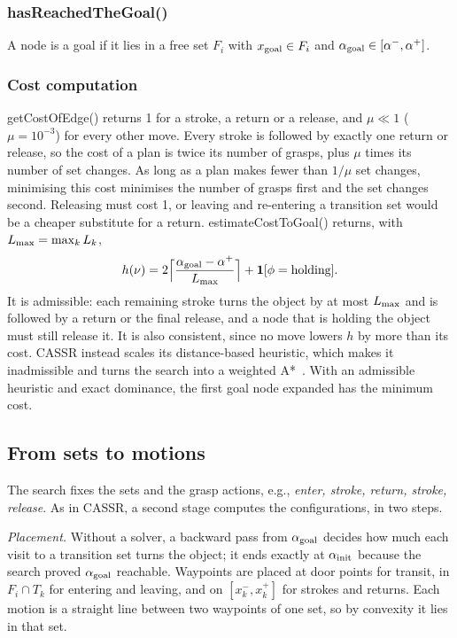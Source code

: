 \subsubsection{hasReachedTheGoal()}
\label{sec:astar:goal}
A node is a goal if it lies in a free set $F_i$ with $x_{\mathrm{goal}}\in F_i$ and
$\alpha_{\mathrm{goal}}\in[\alpha^{-},\alpha^{+}]$.

\subsubsection{Cost computation}
\label{sec:astar:cost}
getCostOfEdge() returns 1 for a stroke, a return or a release, and $\mu\ll1$
($\mu=10^{-3}$) for every other move. Every stroke is followed by exactly one
return or release, so the cost of a plan is twice its number of grasps, plus
$\mu$ times its number of set changes. As long as a plan makes fewer than
$1/\mu$ set changes, minimising this cost minimises the number of grasps
first and the set changes second. Releasing must cost 1, or leaving and
re-entering a transition set would be a cheaper substitute for a return. 
estimateCostToGoal() returns, with $L_{\max}=\max_k L_k$,
\begin{equation}
  h(\nu)=2\Big\lceil\frac{\alpha_{\mathrm{goal}}-\alpha^{+}}{L_{\max}}\Big\rceil+\mathbf{1}[\phi=\text{holding}].
  \label{eq:heuristic}
\end{equation}
It is admissible: each remaining stroke turns the object by at most $L_{\max}$
and is followed by a return or the final release, and a node that is holding
the object must still release it. It is also consistent, since no move lowers
$h$ by more than its cost. CASSR instead scales its distance-based heuristic,
which makes it inadmissible and turns the search into a weighted
A*~\cite{wang2026cassr}. With an admissible heuristic and exact dominance, the
first goal node expanded has the minimum cost.

\subsection{From sets to motions}
\label{sec:method:recovery}
The search fixes the sets and the grasp actions, e.g., \emph{enter, stroke,
return, stroke, release}. As in CASSR, a second stage computes the
configurations, in two steps.

\emph{Placement.} Without a solver, a backward pass from $\alpha_{\mathrm{goal}}$ decides how
much each visit to a transition set turns the object; it ends exactly at
$\alpha_{\mathrm{init}}$ because the search proved $\alpha_{\mathrm{goal}}$ reachable. Waypoints are placed at
door points for transit, in $F_i\cap T_k$ for entering and leaving, and on
$[x_k^-,x_k^+]$ for strokes and returns. Each motion is a straight line
between two waypoints of one set, so by convexity it lies in that set.

